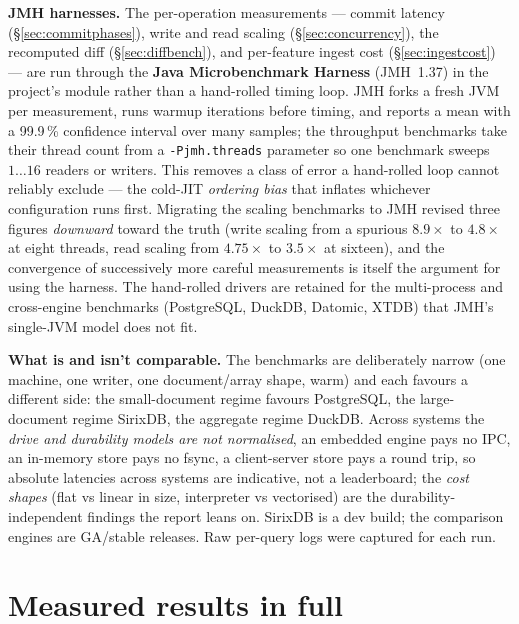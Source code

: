 \documentclass[11pt,a4paper,oneside]{report}
\theoremstyle{sirixthm}
\newcommand{\code}[1]{\texttt{#1}}
\begin{document}
\textbf{JMH harnesses.} The per-operation measurements --- commit latency (\S\ref{sec:commitphases}), write
and read scaling (\S\ref{sec:concurrency}), the recomputed diff (\S\ref{sec:diffbench}), and per-feature
ingest cost (\S\ref{sec:ingestcost}) --- are run through the \textbf{Java Microbenchmark Harness}
(JMH~1.37) in the project's  module rather than a hand-rolled timing loop. JMH forks a
fresh JVM per measurement, runs warmup iterations before timing, and reports a mean with a 99.9\,\%
confidence interval over many samples; the throughput benchmarks take their thread count from a
\code{-Pjmh.threads} parameter so one benchmark sweeps $1\ldots16$ readers or writers. This removes a class
of error a hand-rolled loop cannot reliably exclude --- the cold-JIT \emph{ordering bias} that inflates
whichever configuration runs first. Migrating the scaling benchmarks to JMH revised three figures
\emph{downward} toward the truth (write scaling from a spurious $8.9\times$ to $4.8\times$ at eight threads,
read scaling from $4.75\times$ to $3.5\times$ at sixteen), and the convergence of successively more careful
measurements is itself the argument for using the harness. The hand-rolled drivers are retained for the
multi-process and cross-engine benchmarks (PostgreSQL, DuckDB, Datomic, XTDB) that JMH's single-JVM model
does not fit.

\begin{honesty}
\small\textbf{What is and isn't comparable.} The benchmarks are deliberately narrow (one machine, one
writer, one document/array shape, warm) and each favours a different side: the small-document regime
favours PostgreSQL, the large-document regime SirixDB, the aggregate regime DuckDB. Across systems the
\emph{drive and durability models are not normalised}, an embedded engine pays no IPC, an in-memory store
pays no fsync, a client-server store pays a round trip, so absolute latencies across systems are
indicative, not a leaderboard; the \emph{cost shapes} (flat vs linear in size, interpreter vs vectorised)
are the durability-independent findings the report leans on. SirixDB is a dev build; the comparison
engines are GA/stable releases. Raw per-query logs were captured for each run.
\end{honesty}

\section{Measured results in full}
\label{sec:rawdata}
\end{document}
